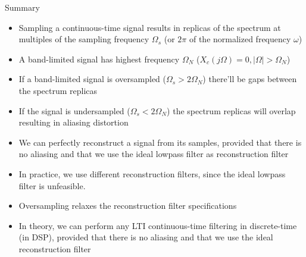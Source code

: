 \documentclass[10pt, aspectratio=169]{beamer}
\begin{document}
\begin{frame}{Summary}
\begin{itemize}
	\item Sampling a continuous-time signal results in replicas of the spectrum at multiples of the sampling frequency $\Omega_s$ (or $2\pi$ of the normalized frequency $\omega$)
	\item A band-limited signal has highest frequency $\Omega_N$ ($X_c(j\Omega) = 0, |\Omega| > \Omega_N$)
	\item If a band-limited signal is oversampled ($\Omega_s > 2\Omega_N$) there'll be gaps between the spectrum replicas
	\item If the signal is undersampled ($\Omega_s < 2\Omega_N$) the spectrum replicas will overlap resulting in aliasing distortion
	\item We can perfectly reconstruct a signal from its samples, provided that there is no aliasing and that we use the ideal lowpass filter as reconstruction filter
	\item In practice, we use different reconstruction filters, since the ideal lowpass filter is unfeasible.
	\item Oversampling relaxes the reconstruction filter specifications
	\item In theory, we can perform any LTI continuous-time filtering in discrete-time (in DSP), provided that there is no aliasing and that we use the ideal reconstruction filter
\end{itemize}

\end{frame}
\end{document}
